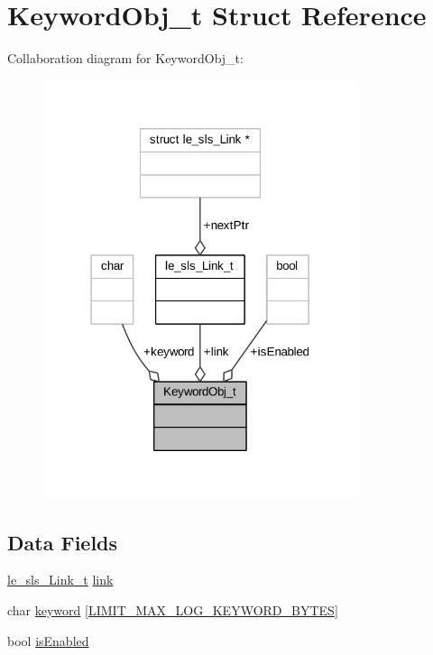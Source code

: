 \hypertarget{struct_keyword_obj__t}{}\section{Keyword\+Obj\+\_\+t Struct Reference}
\label{struct_keyword_obj__t}


Collaboration diagram for Keyword\+Obj\+\_\+t\+:
\nopagebreak
\begin{figure}[H]
\begin{center}
\leavevmode
\includegraphics[width=262pt]{struct_keyword_obj__t__coll__graph}
\end{center}
\end{figure}
\subsection*{Data Fields}
\begin{DoxyCompactItemize}
\item 
\hyperlink{structle__sls___link__t}{le\+\_\+sls\+\_\+\+Link\+\_\+t} \hyperlink{struct_keyword_obj__t_aa5cf5e438d29843b2c03f8f98ebb042e}{link}
\item 
char \hyperlink{struct_keyword_obj__t_ac56b4c194375209f9063b9eafe38a9ee}{keyword} \mbox{[}\hyperlink{limit_8h_a295c601381a60220239f4c26403a59cb}{L\+I\+M\+I\+T\+\_\+\+M\+A\+X\+\_\+\+L\+O\+G\+\_\+\+K\+E\+Y\+W\+O\+R\+D\+\_\+\+B\+Y\+T\+ES}\mbox{]}
\item 
bool \hyperlink{struct_keyword_obj__t_ac2df2a8cac258a7b04c1319b4185bf66}{is\+Enabled}
\end{DoxyCompactItemize}


